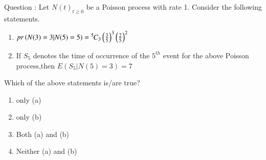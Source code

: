 \documentclass[journal,12pt,twocolumn]{IEEEtran}
\theoremstyle{remark}
\begin{document}
\let\vec\mathbf




\vspace{3cm}



\bigskip

\renewcommand{\thefigure}{\theenumi}
\renewcommand{\thetable}{\theenumi}
Question : Let ${N(t)}_{t\ge 0}$ be a Poisson process with rate 1. Consider the following statements. 
\begin{enumerate}[label=(\alph*)]
\item $pr\left(N(3)=3|N(5)=5\right)={{}^{5}\mkern-1muC_{3}}\left(\frac{3}{5}\right)^3 \left(\frac{2}{5}\right)^2$
\item If $S_5$ denotes the time of occurrence of the $5^{th}$ event for the above Poisson process,then $E(S_5|N(5)=3)=7$ \\
\end{enumerate}
Which of the above statements is/are true?\\
\begin{enumerate}[label=(\roman*)]
\item only (a)
\item only (b)
\item Both (a) and (b)
\item Neither (a) and (b)
\end{enumerate}
\solution \\
\end{document}
